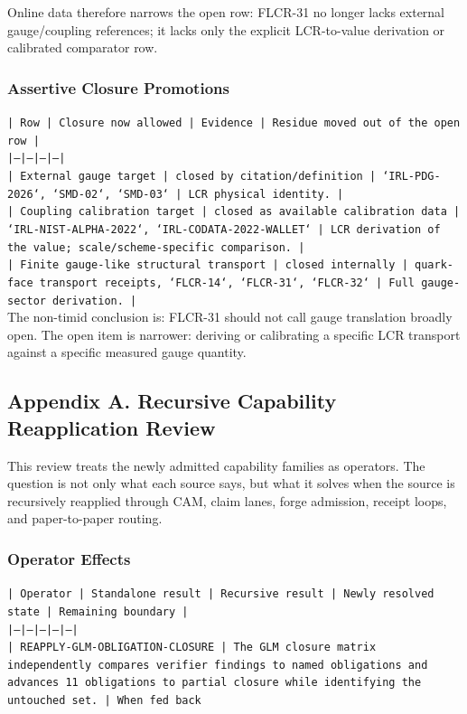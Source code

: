 \documentclass[11pt]{article}
\begin{document}
Online data therefore narrows the open row: FLCR-31 no longer lacks external gauge/coupling references; it lacks only the explicit LCR-to-value derivation or calibrated comparator row.

\subsubsection*{Assertive Closure Promotions}

\noindent\texttt{| Row | Closure now allowed | Evidence | Residue moved out of the open row |}\\
\noindent\texttt{|---|---|---|---|}\\
\noindent\texttt{| External gauge target | closed by citation/definition | `IRL-PDG-2026`, `SMD-02`, `SMD-03` | LCR physical identity. |}\\
\noindent\texttt{| Coupling calibration target | closed as available calibration data | `IRL-NIST-ALPHA-2022`, `IRL-CODATA-2022-WALLET` | LCR derivation of the value; scale/scheme-specific comparison. |}\\
\noindent\texttt{| Finite gauge-like structural transport | closed internally | quark-face transport receipts, `FLCR-14`, `FLCR-31`, `FLCR-32` | Full gauge-sector derivation. |}\\

The non-timid conclusion is: FLCR-31 should not call gauge translation broadly open. The open item is narrower: deriving or calibrating a specific LCR transport against a specific measured gauge quantity.

\subsection*{Appendix A. Recursive Capability Reapplication Review}

This review treats the newly admitted capability families as operators. The question is not only what each source says, but what it solves when the source is recursively reapplied through CAM, claim lanes, forge admission, receipt loops, and paper-to-paper routing.

\subsubsection*{Operator Effects}

\noindent\texttt{| Operator | Standalone result | Recursive result | Newly resolved state | Remaining boundary |}\\
\noindent\texttt{|---|---|---|---|---|}\\
\noindent\texttt{| REAPPLY-GLM-OBLIGATION-CLOSURE | The GLM closure matrix independently compares verifier findings to named obligations and advances 11 obligations to partial closure while identifying the untouched set. | When fed back }\\
\end{document}

